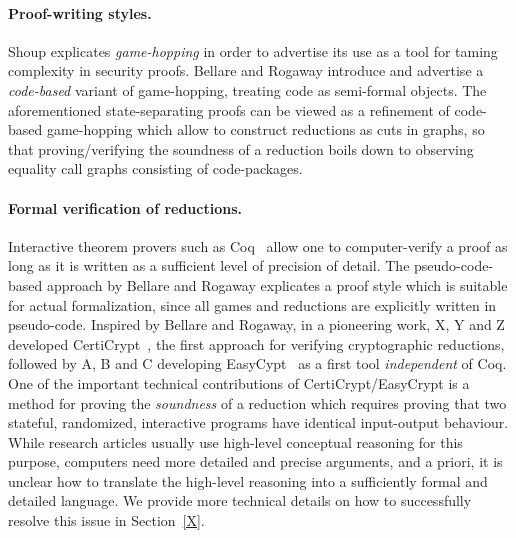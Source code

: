 \paragraph{Proof-writing styles.}
Shoup explicates \emph{game-hopping} in order to advertise its use as a tool for taming complexity in security proofs. 
Bellare and Rogaway introduce and advertise a \emph{code-based} variant of
game-hopping, treating code as semi-formal objects. 
The aforementioned state-separating proofs can be viewed as a refinement of code-based game-hopping which allow to construct reductions as cuts in graphs, so that proving/verifying the soundness of a reduction boils down to observing equality call graphs consisting of code-packages.

\paragraph{Formal verification of reductions.} 
Interactive theorem provers such as Coq~\cite{X} allow one to computer-verify a
proof as long as it is written as a sufficient level of precision of detail.
The pseudo-code-based approach by Bellare and Rogaway explicates a proof style which is suitable for actual formalization, since all games and reductions are explicitly written in pseudo-code. Inspired by Bellare and Rogaway, in a pioneering work, X, Y and Z developed CertiCrypt~\cite{X}, the first approach for verifying cryptographic reductions, followed by A, B and C developing EasyCypt~\cite{X} as a first tool \emph{independent} of Coq. One of the important technical contributions of CertiCrypt/EasyCrypt is a method for proving the \emph{soundness} of a reduction which requires proving that two stateful, randomized, interactive programs have identical input-output behaviour. While research articles usually use high-level conceptual reasoning for this purpose, computers need more detailed and precise arguments, and a priori, it is unclear how to translate the high-level reasoning into a sufficiently formal and detailed language. We provide more technical details on how to successfully resolve this issue in Section~\ref{X}.

